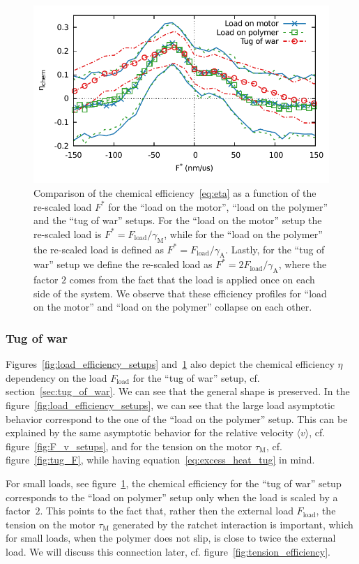 \documentclass[aps,pre,twocolumn,showpacs,showkeys,superscriptaddress,floatfix]{revtex4-1}
\begin{document}
\begin{figure}[t]
\centering
\includegraphics[width=.45\textwidth,height=!]{F_eta_setup_rescaled.pdf}
\caption{\label{fig:load_efficiency_setups_rescaled}
Comparison of the chemical efficiency~\eqref{eq:eta} as a function of the re-scaled load $F^*$ for the ``load on the motor'', ``load on the polymer'' and the ``tug of war'' setups.
For the ``load on the motor'' setup the re-scaled load is $F^* = F_\text{load} / \gamma_\text{M}$, 
while for the ``load on the polymer'' the re-scaled load is defined as $F^* = F_\text{load} / \gamma_\text{A}$.
Lastly, for the ``tug of war'' setup we define the re-scaled load as $F^* = 2 F_\text{load} / \gamma_\text{A}$,
where the factor $2$ comes from the fact that the load is applied once on each side of the system.
We observe that these efficiency profiles for ``load on the motor'' and ``load on the polymer'' collapse on each other.    
}
\end{figure}


\subsubsection{Tug of war}
Figures~\ref{fig:load_efficiency_setups} and~\ref{fig:load_efficiency_setups_rescaled} also depict the chemical efficiency $\eta$ dependency on the load $F_\text{load}$ for the ``tug of war'' setup, cf. section~\ref{sec:tug_of_war}.
We can see that the general shape is preserved.
In the figure~\ref{fig:load_efficiency_setups}, we can see that the large load asymptotic behavior correspond to the one of the ``load on the polymer'' setup.
This can be explained by the same asymptotic behavior for the relative velocity $\langle v\rangle$, cf. figure~\ref{fig:F_v_setups}, 
and for the tension on the motor $\tau_\text{M}$, cf. figure~\ref{fig:tug_F}, while having equation~\eqref{eq:excess_heat_tug} in mind.

For small loads, see figure~\ref{fig:load_efficiency_setups_rescaled}, the chemical efficiency for the ``tug of war'' setup corresponds to the ``load on polymer'' setup only when the load is scaled by a factor~$2$. 
This points to the fact that, rather then the external load $F_\text{load}$, the tension on the motor $\tau_\text{M}$ generated by the ratchet interaction is important,
which for small loads, when the polymer does not slip, is close to twice the external load. 
We will discuss this connection later, cf. figure~\ref{fig:tension_efficiency}. 
\end{document}
